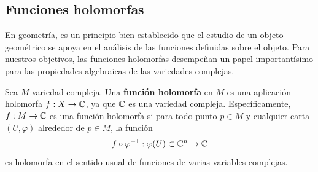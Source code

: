\subsection{Funciones holomorfas}
En geometría, es un principio bien establecido que el estudio de un objeto geométrico se apoya en el análisis de las funciones definidas sobre el objeto. Para nuestros objetivos, las funciones holomorfas desempeñan un papel importantísimo para las propiedades algebraicas de las variedades complejas.

\begin{definition}
	Sea $M$ variedad compleja. Una \textbf{función holomorfa} en $M$ es una aplicación holomorfa $f:X\to\mathbb{C}$, ya que $\mathbb{C}$ es una variedad compleja. Específicamente, $f:M\to \mathbb{C}$ es una función holomorfa si para todo punto $p\in M$ y cualquier carta $(U,\varphi)$ alrededor de $p\in M$, la función
	\begin{equation*}
		f\circ \varphi^{-1}:\varphi(U)\subset\mathbb{C}^n\to\mathbb{C}
	\end{equation*}
	es holomorfa en el sentido usual de funciones de varias variables complejas.
\end{definition}

